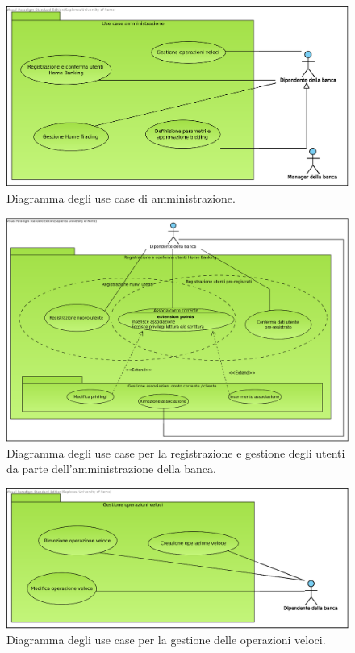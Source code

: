 \begin{figure}
	\centering
	\includegraphics[width=\textwidth]{Images/use-cases/Amministrazione.eps}
	\caption{Diagramma degli use case di amministrazione.}
	\label{fig:use-cases:amministrazione}
\end{figure}

\begin{figure}
	\centering
	\includegraphics[width=\textwidth]{Images/use-cases/Registrazione_e_conferma_utenti_Home_Banking.eps}
	\caption{Diagramma degli use case per la registrazione e gestione degli utenti da parte dell'amministrazione della banca.}
	\label{fig:use-cases:amministrazione:gestione-utenti}
\end{figure}

\begin{figure}
	\centering
	\includegraphics[width=\textwidth]{Images/use-cases/Gestione_operazioni_veloci.eps}
	\caption{Diagramma degli use case per la gestione delle operazioni veloci.}
	\label{fig:use-cases:amministrazione:gestione-operazioni-veloci}
\end{figure}

